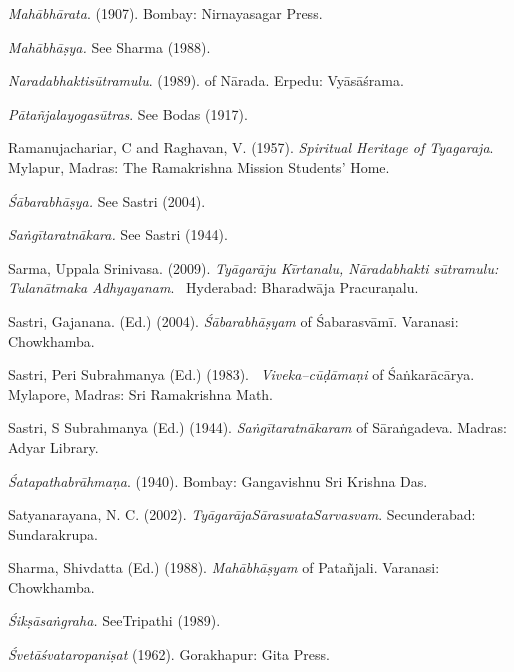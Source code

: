 \begin{thebibliography}{99}
 \item \textit{Mahābhārata}. (1907). Bombay: Nirnayasagar Press. 

 \item \textit{Mahābhāṣya.} See Sharma (1988).

 \item \textit{Naradabhaktisūtramulu}. (1989). of Nārada. Erpedu: Vyāsāśrama.

 \item \textit{Pātañjalayogasūtras}. See Bodas (1917).

 \item Ramanujachariar, C and Raghavan, V. (1957). \textit{Spiritual Heritage of Tyagaraja}. Mylapur, Madras: The Ramakrishna Mission Students’ Home.

 \item \textit{Śābarabhāṣya.} See Sastri (2004).

 \item \textit{Saṅgītaratnākara.} See Sastri (1944).

 \item Sarma, Uppala Srinivasa. (2009). \textit{Tyāgarāju Kīrtanalu, Nāradabhakti sūtramulu: Tulanātmaka Adhyayanam}.  Hyderabad: Bharadwāja Pracuraṇalu.

 \item Sastri, Gajanana. (Ed.) (2004). \textit{Śābarabhāṣyam} of Śabarasvāmī. Varanasi: Chowkhamba.

 \item Sastri, Peri Subrahmanya (Ed.) (1983).  \textit{Viveka–cūḍāmaṇi} of Śaṅkarācārya. Mylapore, Madras: Sri Ramakrishna Math.

 \item Sastri, S Subrahmanya (Ed.) (1944). \textit{Saṅgītaratnākaram} of Sāraṅgadeva. Madras: Adyar Library. 

 \item \textit{Śatapathabrāhmaṇa}. (1940). Bombay: Gangavishnu Sri Krishna Das.

 \item Satyanarayana, N. C. (2002). \textit{TyāgarājaSāraswataSarvasvam}. Secunderabad: Sundarakrupa. 

 \item Sharma, Shivdatta (Ed.) (1988). \textit{Mahābhāṣyam} of Patañjali. Varanasi: Chowkhamba.

 \item \textit{Śikṣāsaṅgraha.} SeeTripathi (1989).

 \item \textit{Śvetāśvataropaniṣat} (1962). Gorakhapur: Gita Press.


\end{thebibliography}
